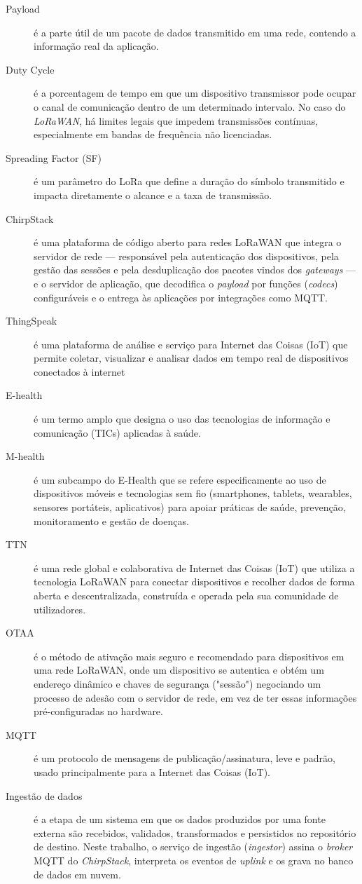 \begin{description}
  \item[Payload] é a parte útil de um pacote de dados transmitido em uma rede, contendo a informação real da aplicação.
  \item[Duty Cycle] é a porcentagem de tempo em que um dispositivo transmissor pode ocupar o canal de comunicação dentro de um determinado intervalo. No caso do \textit{LoRaWAN}, há limites legais que impedem transmissões contínuas, especialmente em bandas de frequência não licenciadas.
  \item[Spreading Factor (SF)] é um parâmetro do LoRa que define a duração do símbolo transmitido e impacta diretamente o alcance e a taxa de transmissão.
  \item [ChirpStack] é uma plataforma de código aberto para redes LoRaWAN que integra o servidor de rede — responsável pela autenticação dos dispositivos, pela gestão das sessões e pela desduplicação dos pacotes vindos dos \textit{gateways} — e o servidor de aplicação, que decodifica o \textit{payload} por funções (\textit{codecs}) configuráveis e o entrega às aplicações por integrações como MQTT.
  \item [ThingSpeak] é uma plataforma de análise e serviço para Internet das Coisas (IoT) que permite coletar, visualizar e analisar dados em tempo real de dispositivos conectados à internet
  \item [E-health] é um termo amplo que designa o uso das tecnologias de informação e comunicação (TICs) aplicadas à saúde.
  \item [M-health] é um subcampo do E-Health que se refere especificamente ao uso de dispositivos móveis e tecnologias sem fio (smartphones, tablets, wearables, sensores portáteis, aplicativos) para apoiar práticas de saúde, prevenção, monitoramento e gestão de doenças.
  \item [TTN] é uma rede global e colaborativa de Internet das Coisas (IoT) que utiliza a tecnologia LoRaWAN para conectar dispositivos e recolher dados de forma aberta e descentralizada, construída e operada pela sua comunidade de utilizadores.
  \item [OTAA] é o método de ativação mais seguro e recomendado para dispositivos em uma rede LoRaWAN, onde um dispositivo se autentica e obtém um endereço dinâmico e chaves de segurança ("sessão") negociando um processo de adesão com o servidor de rede, em vez de ter essas informações pré-configuradas no hardware.
  \item [MQTT] é um protocolo de mensagens de publicação/assinatura, leve e padrão, usado principalmente para a Internet das Coisas (IoT).
  \item [Ingestão de dados] é a etapa de um sistema em que os dados produzidos por uma fonte externa são recebidos, validados, transformados e persistidos no repositório de destino. Neste trabalho, o serviço de ingestão (\textit{ingestor}) assina o \textit{broker} MQTT do \textit{ChirpStack}, interpreta os eventos de \textit{uplink} e os grava no banco de dados em nuvem.
\end{description}